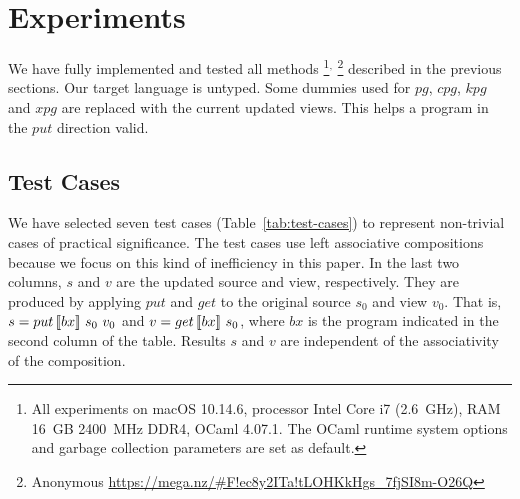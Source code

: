 \section{Experiments} \label{sect:experiments}

We have fully implemented and tested all methods%
%
\footnote{All experiments on macOS 10.14.6, processor Intel Core i7 (2.6~GHz), RAM 16~GB 2400~MHz DDR4, OCaml 4.07.1. The OCaml runtime system options and garbage collection parameters are set as default.}$^,$%
%
\footnote{Anonymous \url{https://mega.nz/\#F!ec8y2ITa!tLOHKkHgs_7fjSI8m-O26Q}}
%
described in the previous sections. Our target language is untyped. Some dummies used for $pg$, $cpg$, $kpg$ and $xpg$ are replaced with the current updated views. This helps a program in the $put$ direction valid.

\subsection{Test Cases}

We have 
selected seven test cases (Table~\ref{tab:test-cases}) to 
represent
non-trivial cases of practical significance.
The test cases use
left associative compositions because we focus on this kind of inefficiency in this paper.
In the last two columns, $s$ and $v$ are the updated source and view, respectively. They are produced by applying $put$ and $get$ to the original source $s_0$ and view $v_0$. That is, $s = put \, [\![bx]\!] \ s_0 \ v_0$ and $v = get \, [\![bx]\!] \ s_0$, where $bx$ is the program indicated in the second column of the table. 
Results $s$ and $v$ are independent of the associativity 
of the composition.

